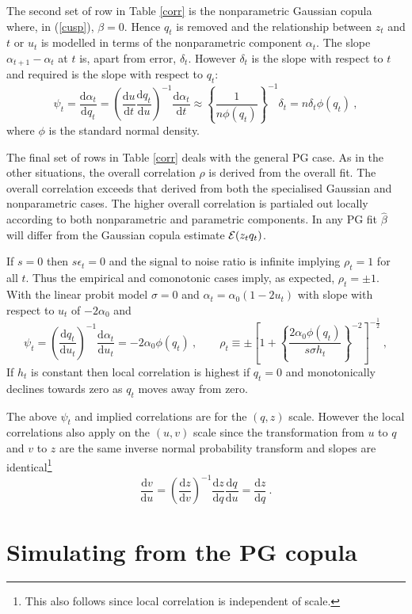 \documentclass[authoryear]{elsarticle}
\newcommand{\eps}{\epsilon}
\newcommand{\Ex}{{\cal E}}
\newcommand{\de}{\mathrm{d}}
\newcommand{\eref}[1]{(\ref{#1})}
\newcommand{\tref}[1]{Table \ref{#1}}
\newcommand{\cq}{\ , \qquad}
\newcommand{\be}[1]{\begin{equation}\label{#1}}
\newcommand{\ee}{\end{equation}}
\begin{document}
The second set of row in \tref{corr} is the nonparametric Gaussian copula where, in \eref{cusp},  $\beta=0$.  Hence $q_t$ is removed and  the relationship between $z_t$ and $t$ or $u_t$ is  modelled in terms of the  nonparametric component $\alpha_t$.  The   slope $\alpha_{t+1}-\alpha_t$  at  $t$ is, apart from error,
$\delta_t$.   However $\delta_t$ is the slope with respect to $t$ and required is the slope with respect to $q_t$:
\be{normslope}
\psi_t=\frac{\de \alpha_t}{\de q_t} = \left( \frac{\de u}{\de t}\frac{\de q_t}{\de u}\right)^{-1}\frac{\de \alpha_t}{\de t}  \approx
\left\{\frac{1}{n\phi(q_t)}\right\}^{-1}\delta_t  = n\delta_t\phi(q_t)\ ,
\ee
where $\phi$ is the standard normal density.    

The final set of rows in \tref{corr} deals with the general PG case.   As in the other situations, the overall correlation $\rho$ is derived from the overall fit.   The overall correlation exceeds that derived from both the specialised Gaussian and nonparametric cases.   The higher overall correlation is partialed out locally according to both nonparametric and parametric components.   In any PG fit $\hat\beta$ will differ from the Gaussian copula estimate $\Ex(z_tq_t)$.  

If $s=0$ then $s\eps_t=0$  and  the signal to noise ratio is infinite implying $\rho_t=1$ for all $t$.  Thus the empirical and comonotonic cases imply, as expected,  $\rho_t=\pm 1$.   With the linear probit model $\sigma=0$ and $\alpha_t=\alpha_0(1-2u_t)$ with slope with respect to $u_t$ of $-2\alpha_0$ and
\be{normslope2}
\psi_t =  \left( \frac{\de q_t}{\de u_t}\right)^{-1}\frac{\de \alpha_t}{\de u_t}  =
 -2\alpha_0\phi(q_t)\cq  \rho_t\equiv\pm\left[1+\left\{\frac{2\alpha_0\phi(q_t)}{s\sigma h_t}\right\}^{-2}\right]^{-\frac{1}{2}}\ ,
\ee
If $h_t$ is constant then  local correlation is  highest if  $q_t=0$ and monotonically declines towards zero as $q_t$ moves away from zero. 

The above $\psi_t$ and implied correlations are for the $(q,z)$ scale.  However the local correlations also apply on the $(u,v)$ scale since the transformation from $u$ to $q$ and $v$ to $z$ are the same inverse normal probability transform and slopes are identical\footnote{This also follows since local correlation is independent of scale.}
$$
\frac{\de v}{\de u} =\left(\frac{\de z}{\de v}\right)^{-1} \frac{\de z}{\de q} \frac{\de q}{\de u} = \frac{\de z}{\de q}\ .
$$

\section{Simulating from the PG copula} 
\end{document}
